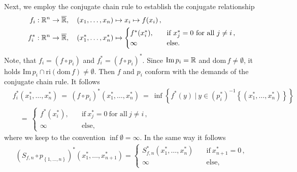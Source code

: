 \begin{example*}
  Next, we employ the conjugate chain rule to establish the conjugate relationship 
  \begin{align*}
    f_i&:\R^n\to \overline{\R}
    ,
    \quad
    (x_1,\ldots,x_n)
    \mapsto x_i \mapsto f(x_i)
    \,,
    \\
    f^*_i&:\R^n\to \overline{\R}
    ,
    \quad
    (x^*_1,\ldots,x^*_n)\mapsto 
    \begin{cases}
      f^*(x_i^*),
      \quad
      &\text{if}\ 
      x_j^*=0\ \text{for all}\ j\neq i\,,
      \\
      \infty
      \quad
      &\text{else.}
    \end{cases}
  \end{align*}
  Note, that 
  $
    f_i
    =
    (f\circ p_i)
  $
  and
  $
    f^*_i
    =
    (f\circ p_i)^*
  $.
  Since 
  $
    \mathrm{Im}\,p_i=\mathbb{R}
  $
  and 
  $
    \mathrm{dom}\, f
    \neq
    \emptyset
  $,
  it holds
  $
    \mathrm{Im}\, p_i
    \cap
    \mathrm{ri}(
    \mathrm{dom}\, f
    )
    \neq
    \emptyset
  $.
  Then $f$ and $p_i$ conform with the demands of the conjugate chain rule.
  It follows
  \begin{align*}
    &f_i^*
    (x^*_1,\ldots,x^*_n) 
    \ 
    =
    \ 
    (f\circ p_i)^*
    (x^*_1,\ldots,x^*_n) 
    \ =
    \ 
    \inf
    \left\{ 
    f^*(y)
    \ 
    |
    \ 
    y\in 
    (p_i^*)^{-1}
    \left\{ 
    (x_1^*,\ldots,x_n^*)
    \right\}
    \right\}
    \\
    &\quad=
    \ 
    \begin{cases}
      f^*(x_i^*),
      \quad
      &\text{if}\ 
      x_j^*=0\ \text{for all}\ j\neq i\,,
      \\
      \infty
      \quad
      &\text{else,}
    \end{cases}
  \end{align*}
  where we keep to the convention $\inf\emptyset=\infty$.
  In the same way it follows
  \begin{gather}
    \left( 
      S_{f,n}
      \circ
      p_{\left\{ 1,\ldots,n \right\}}
    \right)^*
    (x^*_1,\ldots,x^*_{n+1})
    =
    \begin{cases}
      S_{f,n}^*
    (x^*_1,\ldots,x^*_{n})
      \quad
      &\text{if}\ 
      x_{n+1}^*=0\,,
      \\
      \infty
      \quad
      &\text{else,}
    \end{cases}
  \end{gather}


\end{example*}
